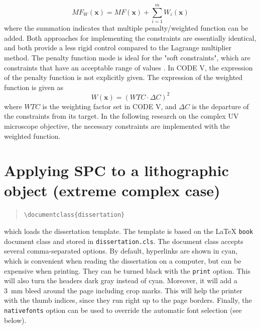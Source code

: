 \setlength{\belowdisplayshortskip}{10pt}
\begin{equation} \label{eq: MFw}
MF_W(\textbf{x})=MF(\textbf{x})+\sum_{i=1}^{m}W_i(\textbf{x})
\end{equation}
where the summation indicates that multiple penalty/weighted function can be added. Both approaches for implementing the constraints are essentially identical, and both provide a less rigid control compared to the Lagrange multiplier method. The penalty function mode is ideal for the "soft constraints", which are constraints that have an acceptable range of values \cite{codevmanual}. In CODE V, the expression of the penalty function is not explicitly given. The expression of the weighted function is given as
\setlength{\belowdisplayshortskip}{5pt}
\setlength{\abovedisplayshortskip}{5pt}
\begin{equation} \label{eq: WTC}
W(\textbf{x})=(WTC\cdot \Delta C)^2
\end{equation}
where $WTC$ is the weighting factor set in CODE V, and $\Delta C$ is the departure of the constraints from its target. In the following research on the complex UV microscope objective, the necessary constraints are implemented with the weighted function.





\section{Applying SPC to a lithographic object (extreme complex case)}


\begin{quote}
\texttt{\textbackslash documentclass\{dissertation\}}
\end{quote}
which loads the dissertation template. The template is based on the \LaTeX{} \texttt{book} document class and stored in \texttt{dissertation.cls}. The document class accepts several comma-separated options. By default, hyperlinks are shown in cyan, which is convenient when reading the dissertation on a computer, but can be expensive when printing. They can be turned black with the \texttt{print} option. This will also turn the headers dark gray instead of cyan. Moreover, it will add a 3~mm bleed around the page including crop marks. This will help the printer with the thumb indices, since they run right up to the page borders. Finally, the \texttt{nativefonts} option can be used to override the automatic font selection (see below).

